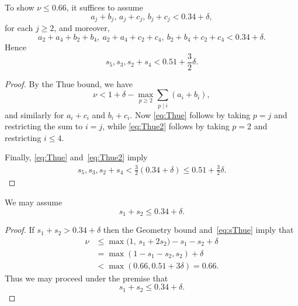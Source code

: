 \begin{proposition}\label{prop:SpecialThue}
  \leanok
  To show $\nu \leq 0.66$, it suffices to assume
  \begin{equation}\label{eq:Thue}
  a_j+b_j, \,a_j+c_j,\, b_j+c_j < 0.34+\delta,
  \end{equation}
  for each $j\geq 2$, and moreover,
  \begin{equation}\label{eq:Thue2}
  a_2+a_4+b_2+b_4, \ a_2+a_4+c_2+c_4, \
  b_2+b_4+c_2+c_4 < 0.34+\delta.
  \end{equation}
  Hence
  \begin{equation}\label{eq:sThue}
  s_5,s_3,s_2+s_4 < 0.51+\frac{3}{2}\delta.
  \end{equation}
\end{proposition}
\begin{proof}
  \leanok
  By the Thue bound, we have
  \[
  \nu < 1 +\delta- \max_{p\ge2}\sum_{p\mid i} (a_i+b_i),
  \]
  and similarly for $a_i+c_i$ and $b_i+c_i$.
  Now \eqref{eq:Thue} follows by taking $p = j$ and restricting the sum to $i = j$, while \eqref{eq:Thue2} follows by taking $p = 2$ and restricting $i \leq 4$.

  Finally, \eqref{eq:Thue} and~\eqref{eq:Thue2} imply
  \begin{align}
    s_5,s_3,s_2+s_4 < \frac{3}{2}(0.34+\delta)\le 0.51+\frac{3}{2}\delta.
  \end{align}
\end{proof}

\begin{lemma}\label{lem:SpecialGeometry}
  \leanok
  We may assume
  \begin{equation}\label{eq:SpecialGeometry}
    s_1+s_2\leq 0.34 +\delta.
  \end{equation}
\end{lemma}
\begin{proof}
  \leanok
  If $s_1+s_2> 0.34+\delta$ then the Geometry bound and~\eqref{eq:sThue} imply that
  \begin{align*}
    \nu & \le \max\big(1,\, s_1+2s_2\big) -s_1-s_2 + \delta
    \\
    & = \max(1-s_1-s_2, s_2) +\delta\\
    &< \max\left(0.66, 0.51+3\delta\right) = 0.66.
  \end{align*}
  Thus we may proceed under the premise that
  \begin{equation*}
    s_1+s_2\leq 0.34 +\delta.
  \end{equation*}
\end{proof}

